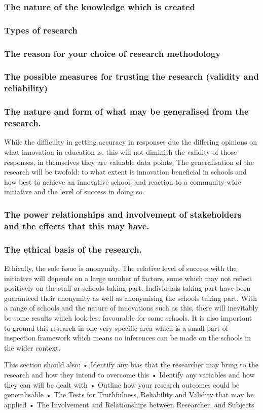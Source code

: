 \subsubsection{The nature of the knowledge which is created}
\subsubsection{Types of research}
\subsubsection{The reason for your choice of research methodology}
\subsubsection{The possible measures for trusting the research (validity and reliability)}
\subsubsection{The nature and form of what may be generalised from the research.}

While the difficulty in getting accuracy in responses due the differing opinions on what innovation in education is, this will not diminish the validity of those responses, in themselves they are valuable data points. The generalisation of the research will be twofold: to what extent is innovation beneficial in schools and how best to achieve an innovative school; and reaction to a community-wide initiative and the level of success in doing so.

\subsubsection{The power relationships and involvement of stakeholders and the effects that this may have.}
\subsubsection{The ethical basis of the research.}
Ethically, the sole issue is anonymity. The relative level of success with the initiative will depends on a large number of factors, some which may not reflect positively on the staff or schools taking part. Individuals taking part have been guaranteed their anonymity as well as anonymising the schools taking part. With a range of schools and the nature of innovations such as this, there will inevitably be some results which look less favourable for some schools. It is also important to ground this research in one very specific area which is a small part of inspection framework which means no inferences can be made on the schools in the wider context.

This section should also:
•	Identify any bias that the researcher may bring to the research and how they intend to overcome this
•	Identify any variables and how they can will be dealt with
•	Outline how your research outcomes could be generalisable
•	The Tests for Truthfulness, Reliability and Validity that may be applied
•	The Involvement and Relationships between Researcher, and Subjects



